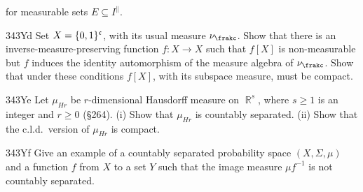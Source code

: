 {\noindent for measurable sets $E\subseteq I^{\|}$.

\spheader 343Yd Set $X=\{0,1\}^{\frak c}$, with its usual measure
$\nu_{\frakc}$.   Show that there is an inverse-measure-preserving function
$f:X\to X$ such that $f[X]$ is non-measurable but $f$ induces the
identity automorphism of the measure algebra of $\nu_{\frakc}$.
   Show that under these conditions $f[X]$, with its
subspace measure, must be compact.   

\spheader 343Ye Let $\mu_{Hr}$ be $r$-dimensional Hausdorff measure on
$\BbbR^s$, where $s\ge 1$ is an integer and $r\ge 0$ (\S264).   (i)
Show that $\mu_{Hr}$ is countably separated.   (ii) Show that the
c.l.d.\ version of $\mu_{Hr}$ is compact.   

\spheader 343Yf Give an example of a countably separated probability
space $(X,\Sigma,\mu)$ and a function $f$ from $X$ to a set $Y$ such
that the image measure $\mu f^{-1}$ is not countably separated.

}%

